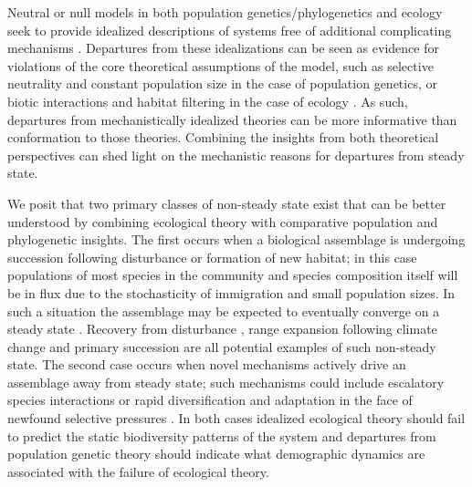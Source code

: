\documentclass[12pt]{article}
\begin{document}
Neutral or null models in both population genetics/phylogenetics and
ecology seek to provide idealized descriptions of systems free of
additional complicating mechanisms \citep{nei2010, hubbell2001,
  harteNewman}. Departures from these idealizations can be seen as
evidence for violations of the core theoretical assumptions of the
model, such as selective neutrality and constant population size in
the case of population genetics\citep{nielsen2005, nei2010}, or biotic
interactions and habitat filtering in the case of ecology
\citep{borer2014, mittelbach2015}.  As such, departures from mechanistically
idealized theories can be more informative than conformation to those
theories.  Combining the insights from both theoretical perspectives
can shed light on the mechanistic reasons for departures from steady
state.

We posit that two primary classes of non-steady state exist that can
be better understood by combining ecological theory with comparative
population and phylogenetic insights.  The first occurs when a
biological assemblage is undergoing succession following disturbance
or formation of new habitat; in this case populations of most species
in the community and species composition itself will be in flux due to
the stochasticity of immigration and small population sizes.  In such
a situation the assemblage may be expected to eventually converge on a
steady state \citep{simberloff1970}. Recovery from disturbance
\citep{simberloff1970}, range expansion following climate change
\citep{blois2010} and primary succession
\citep{shipley2006} are all potential examples of such non-steady
state. The second case occurs when novel mechanisms actively drive an
assemblage away from steady state; such mechanisms could include
escalatory species interactions or rapid diversification and
adaptation in the face of newfound selective pressures
\citep{rominger2015GEB}. In both cases idealized ecological theory
should fail to predict the static biodiversity patterns of the system
and departures from population genetic theory should indicate what
demographic dynamics are associated with the failure of ecological
theory.
\end{document}
